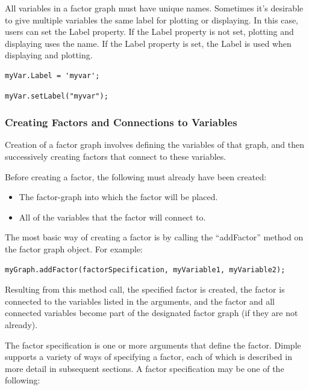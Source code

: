\fi

All variables in a factor graph must have unique names.  Sometimes it's desirable to give multiple variables the same label for plotting or displaying.  In this case, users can set the Label property.  If the Label property is not set, plotting and displaying uses the name.  If the Label property is set, the Label is used when displaying and plotting.

\ifmatlab
\begin{lstlisting}
myVar.Label = 'myvar';
\end{lstlisting}
\fi

\ifjava
\begin{lstlisting}
myVar.setLabel("myvar");
\end{lstlisting}
\fi

\subsubsection{Creating Factors and Connections to Variables}
\label{sec:CreatingFactors}


Creation of a factor graph involves defining the variables of that graph, and then successively creating factors that connect to these variables.

Before creating a factor, the following must already have been created:
\begin{itemize}
\item The factor-graph into which the factor will be placed.
\item All of the variables that the factor will connect to.
\end{itemize}

The most basic way of creating a factor is by calling the ``addFactor'' method on the factor graph object.  For example:

\begin{lstlisting}
myGraph.addFactor(factorSpecification, myVariable1, myVariable2);
\end{lstlisting}

Resulting from this method call, the specified factor is created, the factor is connected to the variables listed in the arguments, and the factor and all connected variables become part of the designated factor graph (if they are not already).

The factor specification is one or more arguments that define the factor.  Dimple supports a variety of ways of specifying a factor, each of which is described in more detail in subsequent sections.  A factor specification may be one of the following:

